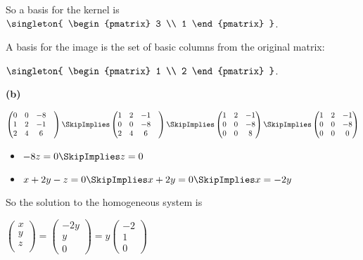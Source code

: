 \documentclass[oneside,12pt]{amsart}
\begin{document}
So a basis for the kernel is
$\singleton{
\begin{pmatrix}
3 \\ 1
\end{pmatrix}
}$.

A basis for the image is the set of basic columns from the original matrix:

$\singleton{
\begin{pmatrix}
1 \\ 2
\end{pmatrix}
}$.

\bigskip

\textbf{(b)}

\bigskip

$
\begin{pmatrix}
0 & 0 & -8  \\
1 & 2 & -1  \\
2 & 4 & 6 &
\end{pmatrix}
\SkipImplies
\begin{pmatrix}
1 & 2 & -1  \\
0 & 0 & -8  \\
2 & 4 &  6 &
\end{pmatrix}
\SkipImplies
\begin{pmatrix}
1 & 2 & -1 \\
0 & 0 & -8 \\
0 & 0 &  8
\end{pmatrix}
\SkipImplies
\begin{pmatrix}
1 & 2 & -1 \\
0 & 0 & -8 \\
0 & 0 &  0
\end{pmatrix}
$

\begin{itemize}
\item $-8z = 0 \SkipImplies z = 0$
\item $x + 2y - z = 0 \SkipImplies x + 2y = 0 \SkipImplies x = -2y$
\end{itemize}


So the solution to the homogeneous system is

$
\begin{pmatrix}
x \\
y \\
z \\
\end{pmatrix}
=
\begin{pmatrix}
-2y \\
y \\
0
\end{pmatrix}
=
y
\begin{pmatrix}
-2 \\ 1 \\ 0
\end{pmatrix}
$
\end{document}
